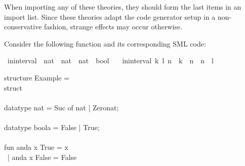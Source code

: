 \begin{isabellebody}
\begin{isamarkuptext}
  \begin{warn}
    When importing any of these theories, they should form the last
    items in an import list.  Since these theories adapt the
    code generator setup in a non-conservative fashion,
    strange effects may occur otherwise.
  \end{warn}%
\end{isamarkuptext}%
\isamarkuptrue%
%
\isamarkuptrue%
%
\begin{isamarkuptext}%
Consider the following function and its corresponding
  SML code:%
\end{isamarkuptext}%
\isamarkuptrue%
%
\isadelimquote
%
\endisadelimquote
%
\isatagquote
{}\isamarkupfalse%
\ in{\isacharunderscore}interval\ {\isacharcolon}{\isacharcolon}\ {\isachardoublequoteopen}nat\ {\isasymtimes}\ nat\ {\isasymRightarrow}\ nat\ {\isasymRightarrow}\ bool{\isachardoublequoteclose}\ \isanewline
\ \ {\isachardoublequoteopen}in{\isacharunderscore}interval\ {\isacharparenleft}k{\isacharcomma}\ l{\isacharparenright}\ n\ {\isasymlongleftrightarrow}\ k\ {\isasymle}\ n\ {\isasymand}\ n\ {\isasymle}\ l{\isachardoublequoteclose}%
\endisatagquote
{\isafoldquote}%
%
\isadelimquote
%
\endisadelimquote
%
\isadeliminvisible
%
\endisadeliminvisible
%
\isataginvisible
%
\endisataginvisible
{\isafoldinvisible}%
%
\isadeliminvisible
%
\endisadeliminvisible
%
\isadelimquote
%
\endisadelimquote
%
\isatagquote
%
\begin{isamarkuptext}%
\isaverbatim%
\noindent%
\hspace*{0pt}structure Example = \\
\hspace*{0pt}struct\\
\hspace*{0pt}\\
\hspace*{0pt}datatype nat = Suc of nat | Zero{}nat;\\
\hspace*{0pt}\\
\hspace*{0pt}datatype boola = False | True;\\
\hspace*{0pt}\\
\hspace*{0pt}fun anda x True = x\\
\hspace*{0pt} ~| anda x False = False\\

\end{isamarkuptext}
\end{isabellebody}
